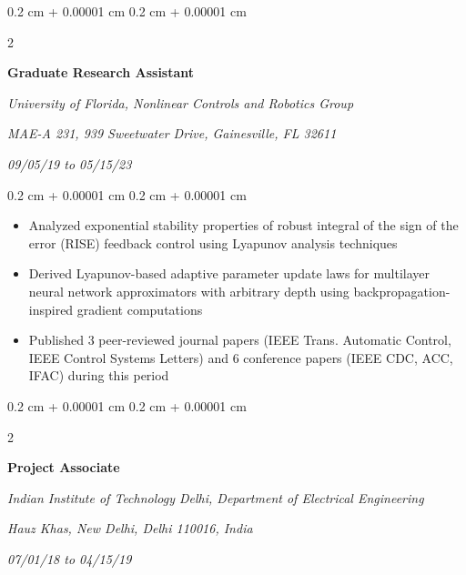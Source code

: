 \documentclass[10pt, letterpaper]{article}
\newenvironment{highlights}{
    \begin{itemize}[
        topsep=0.10 cm,
        parsep=0.10 cm,
        partopsep=0pt,
        itemsep=0pt,
        leftmargin=0.4 cm + 10pt
    ]
}{
    \end{itemize}
} %
\newenvironment{onecolentry}{
    \begin{adjustwidth}{
        0.2 cm + 0.00001 cm
    }{
        0.2 cm + 0.00001 cm
    }
}{
    \end{adjustwidth}
} %
\newenvironment{twocolentry}[2][]{
    \onecolentry
    \def\secondColumn{#2}
    \setcolumnwidth{\fill, 4.5 cm}
    \begin{paracol}{2}
}{
    \switchcolumn \raggedleft \secondColumn
    \end{paracol}
    \endonecolentry
} %
\begin{document}
        \vspace{0.05 cm}

        \begin{twocolentry}{
            
            
        \textit{09/05/19 to 05/15/23}}
            \textbf{Graduate Research Assistant}
            
            \textit{University of Florida, Nonlinear Controls and Robotics Group}
            
            \textit{MAE-A 231, 939 Sweetwater Drive, Gainesville, FL 32611}
        \end{twocolentry}

        \vspace{0.05 cm}
        \begin{onecolentry}
            \begin{highlights}
                \setlength{\itemsep}{0pt}
                \item Analyzed exponential stability properties of robust integral of the sign of the error (RISE) feedback control using Lyapunov analysis techniques
                \item Derived Lyapunov-based adaptive parameter update laws for multilayer neural network approximators with arbitrary depth using backpropagation-inspired gradient computations
                \item Published 3 peer-reviewed journal papers (IEEE Trans. Automatic Control, IEEE Control Systems Letters) and 6 conference papers (IEEE CDC, ACC, IFAC) during this period
            \end{highlights}
        \end{onecolentry}


        \vspace{0.05 cm}

        \begin{twocolentry}{
            
            
        \textit{07/01/18 to 04/15/19}}
            \textbf{Project Associate}
            
            \textit{Indian Institute of Technology Delhi, Department of Electrical Engineering}
            
            \textit{Hauz Khas, New Delhi, Delhi 110016, India}
        \end{twocolentry}
\end{document}
